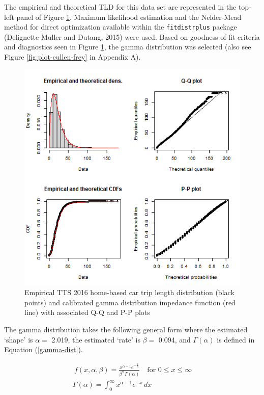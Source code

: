 \documentclass[]{elsarticle} %
\begin{document}
The empirical and theoretical TLD for this data set are represented in
the top-left panel of Figure \ref{fig:TLD-Gamma-plot}. Maximum
likelihood estimation and the Nelder-Mead method for direct optimization
available within the \texttt{fitdistrplus} package (Delignette-Muller
and Dutang, 2015) were used. Based on goodness-of-fit criteria and
diagnostics seen in Figure \ref{fig:TLD-Gamma-plot}, the gamma
distribution was selected (also see Figure \ref{fig:plot-cullen-frey} in
Appendix A).

\begin{figure}

{\centering \includegraphics[width=1\linewidth]{images/impedance_function} 

}

\caption{\label{fig:TLD-Gamma-plot}Empirical TTS 2016 home-based car trip length distribution (black points) and calibrated gamma distribution impedance function (red line) with associated Q-Q and P-P plots}\label{fig:TLD-Gamma-plot}
\end{figure}

The gamma distribution takes the following general form where the
estimated `shape' is \(\alpha=\) 2.019, the estimated `rate' is
\(\beta =\) 0.094, and \(\Gamma(\alpha)\) is defined in Equation
(\ref{gamma-dist}).

\begin{equation}
\label{gamma-dist}
\begin{array}{l}\ 
f(x, \alpha, \beta) = \frac {x^{\alpha-1}e^{-\frac{x}{\beta}}}{ \beta^{\alpha}\Gamma(\alpha)} \quad \text{for } 0 \leq x \leq \infty\\

\Gamma(\alpha) =  \int_{0}^{\infty} x^{\alpha-1}e^{-x} \,dx\\
\end{array}
\end{equation}
\end{document}
